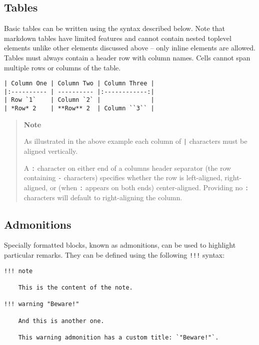 \hypertarget{13092196581825070152}{}


\subsection{Tables}



Basic tables can be written using the syntax described below. Note that markdown tables have limited features and cannot contain nested toplevel elements unlike other elements discussed above – only inline elements are allowed. Tables must always contain a header row with column names. Cells cannot span multiple rows or columns of the table.




\begin{lstlisting}
| Column One | Column Two | Column Three |
|:---------- | ---------- |:------------:|
| Row `1`    | Column `2` |              |
| *Row* 2    | **Row** 2  | Column ``3`` |
\end{lstlisting}



\begin{quote}
\textbf{Note}

As illustrated in the above example each column of \texttt{|} characters must be aligned vertically.

A \texttt{:} character on either end of a column{\textquotesingle}s header separator (the row containing \texttt{-} characters) specifies whether the row is left-aligned, right-aligned, or (when \texttt{:} appears on both ends) center-aligned. Providing no \texttt{:} characters will default to right-aligning the column.

\end{quote}


\hypertarget{7215905182614360565}{}


\subsection{Admonitions}



Specially formatted blocks, known as admonitions, can be used to highlight particular remarks. They can be defined using the following \texttt{!!!} syntax:




\begin{lstlisting}
!!! note

    This is the content of the note.

!!! warning "Beware!"

    And this is another one.

    This warning admonition has a custom title: `"Beware!"`.
\end{lstlisting}



